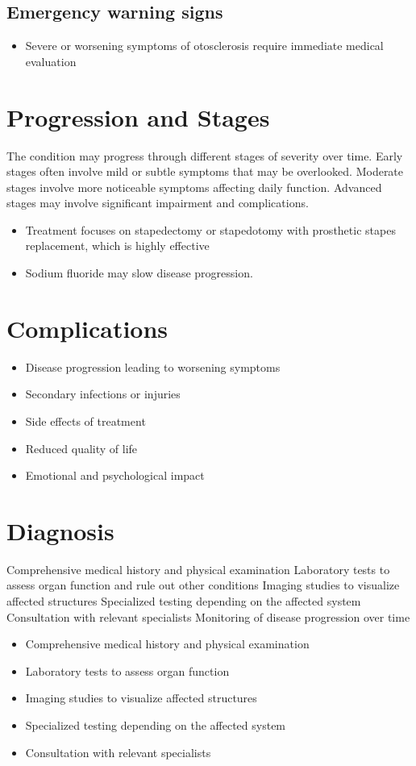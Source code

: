 \subsection{Emergency warning signs}
\begin{itemize}[noitemsep]
  \item Severe or worsening symptoms of otosclerosis require immediate medical evaluation
\end{itemize}
\section{Progression and Stages}
The condition may progress through different stages of severity over time. Early stages often involve mild or subtle symptoms that may be overlooked. Moderate stages involve more noticeable symptoms affecting daily function. Advanced stages may involve significant impairment and complications.

\begin{itemize}[noitemsep]
  \item Treatment focuses on stapedectomy or stapedotomy with prosthetic stapes replacement, which is highly effective
  \item Sodium fluoride may slow disease progression.
\end{itemize}
\section{Complications}
\begin{itemize}[noitemsep]
  \item Disease progression leading to worsening symptoms
  \item Secondary infections or injuries
  \item Side effects of treatment
  \item Reduced quality of life
  \item Emotional and psychological impact
\end{itemize}
\section{Diagnosis}
Comprehensive medical history and physical examination Laboratory tests to assess organ function and rule out other conditions Imaging studies to visualize affected structures Specialized testing depending on the affected system Consultation with relevant specialists Monitoring of disease progression over time

\begin{itemize}[noitemsep]
  \item Comprehensive medical history and physical examination
  \item Laboratory tests to assess organ function
  \item Imaging studies to visualize affected structures
  \item Specialized testing depending on the affected system
  \item Consultation with relevant specialists
\end{itemize}
